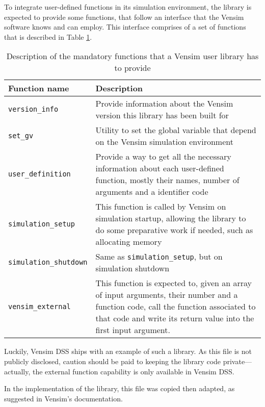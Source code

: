 To integrate user-defined functions in its simulation environment, the library is expected to provide some functions, that follow an interface that the Vensim software knows and can employ. This interface comprises of a set of functions that is described in Table \ref{table:vensim-interface}.
\begin{table}[h]
    \centering
    \begin{tabular}{|m{4.1cm}|m{12cm}|}
        \hline
        Function name & Description \\ \hline
        \texttt{version\_info} & Provide information about the Vensim version this library has been built for \\
        \texttt{set\_gv} & Utility to set the global variable that depend on the Vensim simulation environment \\
        \texttt{user\_definition} & Provide a way to get all the necessary information about each user-defined function, mostly their names, number of arguments and a identifier code \\
        \texttt{simulation\_setup} & This function is called by Vensim on simulation startup, allowing the library to do some preparative work if needed, such as allocating memory \\
        \texttt{simulation\_shutdown} & Same as \texttt{simulation\_setup}, but on simulation shutdown \\
        \texttt{vensim\_external} & This function is expected to, given an array of input arguments, their number and a function code, call the function associated to that code and write its return value into the first input argument.\\
        \hline
    \end{tabular}
    \caption{Description of the mandatory functions that a Vensim user library has to provide}
    \label{table:vensim-interface}
\end{table}

Luckily, %
Vensim DSS ships with an example of such a library. As this file is not publicly disclosed, caution should be paid to keeping the library code private---actually, the external function capability is only available in Vensim DSS.

In the implementation of the library, this file was copied then adapted, as suggested in Vensim's documentation.


